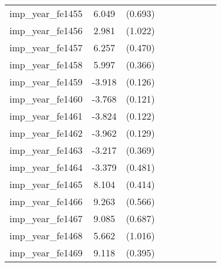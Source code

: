 {\begin{tabular}{l*{4}{cc}}
imp\_year\_fe1455&    6.049\sym{***}&  (0.693)&                  &         &                  &         &                  &         \\
imp\_year\_fe1456&    2.981\sym{**} &  (1.022)&                  &         &                  &         &                  &         \\
imp\_year\_fe1457&    6.257\sym{***}&  (0.470)&                  &         &                  &         &                  &         \\
imp\_year\_fe1458&    5.997\sym{***}&  (0.366)&                  &         &                  &         &                  &         \\
imp\_year\_fe1459&   -3.918\sym{***}&  (0.126)&                  &         &                  &         &                  &         \\
imp\_year\_fe1460&   -3.768\sym{***}&  (0.121)&                  &         &                  &         &                  &         \\
imp\_year\_fe1461&   -3.824\sym{***}&  (0.122)&                  &         &                  &         &                  &         \\
imp\_year\_fe1462&   -3.962\sym{***}&  (0.129)&                  &         &                  &         &                  &         \\
imp\_year\_fe1463&   -3.217\sym{***}&  (0.369)&                  &         &                  &         &                  &         \\
imp\_year\_fe1464&   -3.379\sym{***}&  (0.481)&                  &         &                  &         &                  &         \\
imp\_year\_fe1465&    8.104\sym{***}&  (0.414)&                  &         &                  &         &                  &         \\
imp\_year\_fe1466&    9.263\sym{***}&  (0.566)&                  &         &                  &         &                  &         \\
imp\_year\_fe1467&    9.085\sym{***}&  (0.687)&                  &         &                  &         &                  &         \\
imp\_year\_fe1468&    5.662\sym{***}&  (1.016)&                  &         &                  &         &                  &         \\
imp\_year\_fe1469&    9.118\sym{***}&  (0.395)&                  &         &                  &         &                  &         \\

\end{tabular}}
